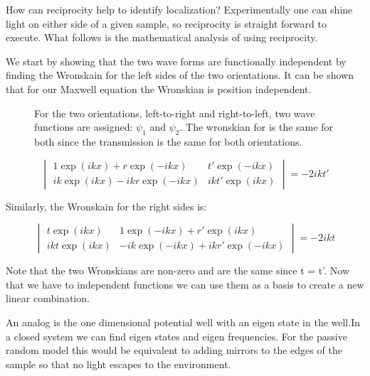 How can reciprocity help to identify localization? Experimentally one can shine light on either side of a given sample, so reciprocity is straight forward to execute.  What follows is	%
the mathematical analysis of using reciprocity.

We start by showing that the two wave forms are functionally independent by finding the Wronskain for the left sides of the two orientations. It can be shown that for our Maxwell equation the Wronskian is position independent.

\begin{figure}
\vskip -0.5cm
\centerline{
}
\vskip -0.5cm
\caption[For the two orientations, left-to-right and right-to-left, two wave functions are assigned: $ \psi _1$ and $ \psi _2$.]{For the two orientations, left-to-right and right-to-left, two wave functions are assigned: $ \psi _1$ and $ \psi _2$. The wronskian for is the same for both since the transmission is the same for both orientations.}
\label{fig:wronskainLRRL}
\end{figure}

\begin{equation}
\begin{vmatrix}
1 \exp(i k x) + r \exp(-i k x) & t' \exp(-i k x) \\
i k \exp(i k x) - i k r \exp(-i k x) & i k t' \exp(i k x)
\end{vmatrix}
 = -2 i k t'
\label{eq:wronskleft}
\end{equation}

Similarly, the Wronskain for the right sides is: %

\begin{equation}
\begin{vmatrix}
 t \exp(i k x) & 1 \exp(-i k x) + r' \exp(i k x)\\
i k t \exp(i k x) & -i k \exp(-i k x) + i k r' \exp(-i k x)
\end{vmatrix}
 = -2 i k t
 \label{eq:wronskright}
\end{equation}

Note that the two Wronskians are non-zero and are the same since t = t'. Now that we have to independent functions we can use them as a basis to create a new linear combination.

An analog is the one dimensional potential well with an eigen state in the well.In a closed system we can find eigen states and eigen frequencies.  For the passive random model this would be equivalent to adding mirrors to the edges of the sample so that no light escapes to the environment.

